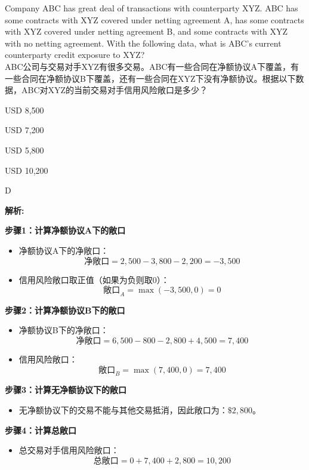 \documentclass{article}
\newcounter{question} %
\newenvironment{explanation}
{\textbf{解析:}\par}
{\par}
\begin{document}
\begin{question}
    Company ABC has great deal of transactions with counterparty XYZ. ABC has some contracts with XYZ covered under netting agreement A, has some contracts with XYZ covered under netting agreement B, and some contracts with XYZ with no netting agreement. With the following data, what is ABC's current counterparty credit exposure to XYZ?
    \\ ABC公司与交易对手XYZ有很多交易。ABC有一些合同在净额协议A下覆盖，有一些合同在净额协议B下覆盖，还有一些合同在XYZ下没有净额协议。根据以下数据，ABC对XYZ的当前交易对手信用风险敞口是多少？
\end{question}

\begin{choices}
    \item USD 8,500
    \item USD 7,200
    \item USD 5,800
    \item USD 10,200
\end{choices}

\begin{correctanswer}
    D
\end{correctanswer}

\begin{explanation}

    \textbf{步骤1：计算净额协议A下的敞口}
    \begin{itemize}
        \item 净额协议A下的净敞口：
        \[
        \text{净敞口} = 2,500 - 3,800 - 2,200 = -3,500
        \]
        \item 信用风险敞口取正值（如果为负则取0）：
        \[
        \text{敞口}_A = \max(-3,500, 0) = 0
        \]
    \end{itemize}

    \textbf{步骤2：计算净额协议B下的敞口}
    \begin{itemize}
        \item 净额协议B下的净敞口：
        \[
        \text{净敞口} = 6,500 - 800 - 2,800 + 4,500 = 7,400
        \]
        \item 信用风险敞口：
        \[
        \text{敞口}_B = \max(7,400, 0) = 7,400
        \]
    \end{itemize}

    \textbf{步骤3：计算无净额协议下的敞口}
    \begin{itemize}
        \item 无净额协议下的交易不能与其他交易抵消，因此敞口为：$\$2,800$。
    \end{itemize}

    \textbf{步骤4：计算总敞口}
    \begin{itemize}
        \item 总交易对手信用风险敞口：
        \[
        \text{总敞口} = 0 + 7,400 + 2,800 = 10,200
        \]
    \end{itemize} 

  
\end{explanation}
\end{document}
